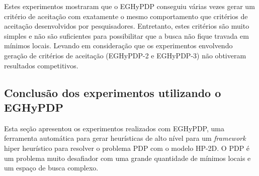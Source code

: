 	Estes experimentos mostraram que o EGHyPDP conseguiu várias vezes gerar um critério de aceitação com exatamente o mesmo comportamento que critérios de aceitação desenvolvidos por pesquisadores. Entretanto, estes critérios são muito simples e não são suficientes para possibilitar que a busca não fique travada em mínimos locais. Levando em consideração que os experimentos envolvendo geração de critérios de aceitação (EGHyPDP-2 e EGHyPDP-3) não obtiveram resultados competitivos. 
	
	
	\subsection{Conclusão dos experimentos utilizando o EGHyPDP}
	
	Esta seção apresentou os experimentos realizados com EGHyPDP, uma ferramenta automática para gerar heurísticas de alto nível para um \textit{framework} hiper heurístico para resolver o problema PDP com o modelo HP-2D. O PDP é um problema muito desafiador com uma grande quantidade de mínimos locais e um espaço de busca complexo. 
	
